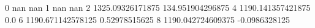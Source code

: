 0 nan nan
1 nan nan
2 1325.09326171875 134.951904296875
4 1190.141357421875 0.0
6 1190.671142578125 0.52978515625
8 1190.042724609375 -0.0986328125
